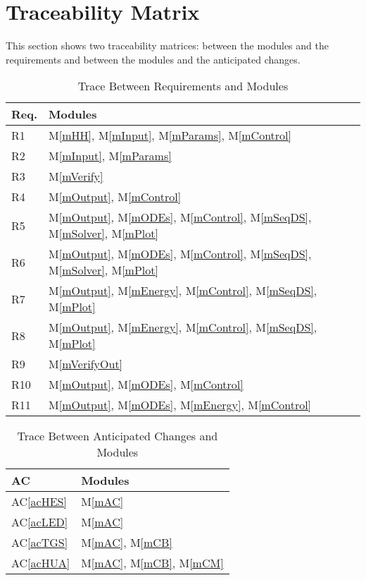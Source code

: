 \documentclass[12pt, titlepage]{article}
\newcommand{\acref}[1]{AC\ref{#1}}
\newcommand{\mref}[1]{M\ref{#1}}
\begin{document}
\section{Traceability Matrix} \label{SecTM}
This section shows two traceability matrices: between the modules and the
requirements and between the modules and the anticipated changes.

\begin{table}[H]
\centering
\begin{tabular}{p{} p{}}
\toprule
\textbf{Req.} & \textbf{Modules}\\
\midrule
R1 & \mref{mHH}, \mref{mInput}, \mref{mParams}, \mref{mControl}\\
R2 & \mref{mInput}, \mref{mParams}\\
R3 & \mref{mVerify}\\
R4 & \mref{mOutput}, \mref{mControl}\\
R5 & \mref{mOutput}, \mref{mODEs}, \mref{mControl}, \mref{mSeqDS}, \mref{mSolver}, \mref{mPlot}\\
R6 & \mref{mOutput}, \mref{mODEs}, \mref{mControl}, \mref{mSeqDS}, \mref{mSolver}, \mref{mPlot}\\
R7 & \mref{mOutput}, \mref{mEnergy}, \mref{mControl}, \mref{mSeqDS}, \mref{mPlot}\\
R8 & \mref{mOutput}, \mref{mEnergy}, \mref{mControl}, \mref{mSeqDS}, \mref{mPlot}\\
R9 & \mref{mVerifyOut}\\
R10 & \mref{mOutput}, \mref{mODEs}, \mref{mControl}\\
R11 & \mref{mOutput}, \mref{mODEs}, \mref{mEnergy}, \mref{mControl}\\
\bottomrule
\end{tabular}
\caption{Trace Between Requirements and Modules}
\label{TblRT}
\end{table}

\begin{table}[H]
\centering
\begin{tabular}{p{} p{}}
\toprule
\textbf{AC} & \textbf{Modules}\\
\midrule
\acref{acHES} & \mref{mAC}\\
\acref{acLED} & \mref{mAC}\\
\acref{acTGS} & \mref{mAC}, \mref{mCB}\\
\acref{acHUA} & \mref{mAC}, \mref{mCB}, \mref{mCM}\\
\bottomrule
\end{tabular}
\caption{Trace Between Anticipated Changes and Modules}
\label{TblACT}
\end{table}
\end{document}
